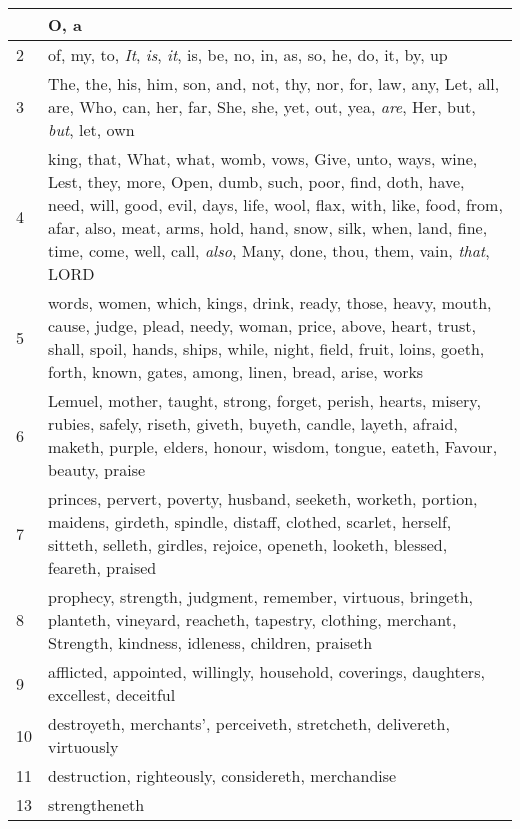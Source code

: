 \begin{center}
\begin{longtable}{l|p{3.75in}}
\hline \hline 
\endlastfoot 
1 & O, a\\ \hline 
2 & of, my, to, \emph{It}, \emph{is}, \emph{it}, is, be, no, in, as, so, he, do, it, by, up\\ \hline 
3 & The, the, his, him, son, and, not, thy, nor, for, law, any, Let, all, are, Who, can, her, far, She, she, yet, out, yea, \emph{are}, Her, but, \emph{but}, let, own\\ \hline 
4 & king, that, What, what, womb, vows, Give, unto, ways, wine, Lest, they, more, Open, dumb, such, poor, find, doth, have, need, will, good, evil, days, life, wool, flax, with, like, food, from, afar, also, meat, arms, hold, hand, snow, silk, when, land, fine, time, come, well, call, \emph{also}, Many, done, thou, them, vain, \emph{that}, LORD\\ \hline 
5 & words, women, which, kings, drink, ready, those, heavy, mouth, cause, judge, plead, needy, woman, price, above, heart, trust, shall, spoil, hands, ships, while, night, field, fruit, loins, goeth, forth, known, gates, among, linen, bread, arise, works\\ \hline 
6 & Lemuel, mother, taught, strong, forget, perish, hearts, misery, rubies, safely, riseth, giveth, buyeth, candle, layeth, afraid, maketh, purple, elders, honour, wisdom, tongue, eateth, Favour, beauty, praise\\ \hline 
7 & princes, pervert, poverty, husband, seeketh, worketh, portion, maidens, girdeth, spindle, distaff, clothed, scarlet, herself, sitteth, selleth, girdles, rejoice, openeth, looketh, blessed, feareth, praised\\ \hline 
8 & prophecy, strength, judgment, remember, virtuous, bringeth, planteth, vineyard, reacheth, tapestry, clothing, merchant, Strength, kindness, idleness, children, praiseth\\ \hline 
9 & afflicted, appointed, willingly, household, coverings, daughters, excellest, deceitful\\ \hline 
10 & destroyeth, merchants', perceiveth, stretcheth, delivereth, virtuously\\ \hline 
11 & destruction, righteously, considereth, merchandise\\ \hline 
13 & strengtheneth\\ \hline 
\end{longtable} 
\end{center} 




 
